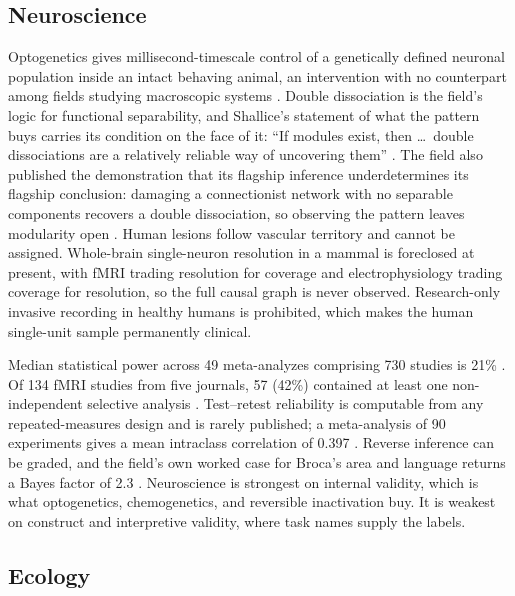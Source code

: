 \documentclass{article}
\begin{document}
\subsection{Neuroscience}

Optogenetics gives millisecond-timescale control of a genetically defined neuronal population inside an intact behaving animal, an intervention with no counterpart among fields studying macroscopic systems \citep{boyden2005millisecond}. Double dissociation is the field's logic for functional separability, and Shallice's statement of what the pattern buys carries its condition on the face of it: ``If modules exist, then \ldots\ double dissociations are a relatively reliable way of uncovering them'' \citep{shallice1988neuropsychology}. The field also published the demonstration that its flagship inference underdetermines its flagship conclusion: damaging a connectionist network with no separable components recovers a double dissociation, so observing the pattern leaves modularity open \citep{plaut1995double}. Human lesions follow vascular territory and cannot be assigned. Whole-brain single-neuron resolution in a mammal is foreclosed at present, with fMRI trading resolution for coverage and electrophysiology trading coverage for resolution, so the full causal graph is never observed. Research-only invasive recording in healthy humans is prohibited, which makes the human single-unit sample permanently clinical.

Median statistical power across 49 meta-analyzes comprising 730 studies is 21\% \citep{nord2017power}. Of 134 fMRI studies from five journals, 57 (42\%) contained at least one non-independent selective analysis \citep{kriegeskorte2009circular}. Test--retest reliability is computable from any repeated-measures design and is rarely published; a meta-analysis of 90 experiments gives a mean intraclass correlation of 0.397 \citep{elliott2020test}. Reverse inference can be graded, and the field's own worked case for Broca's area and language returns a Bayes factor of 2.3 \citep{poldrack2006cognitive}. Neuroscience is strongest on internal validity, which is what optogenetics, chemogenetics, and reversible inactivation buy. It is weakest on construct and interpretive validity, where task names supply the labels.

\subsection{Ecology}
\end{document}

